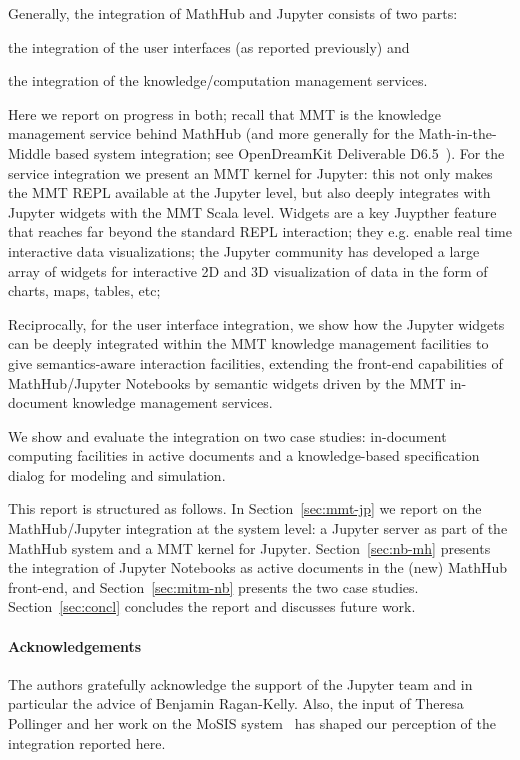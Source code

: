 Generally, the integration of MathHub and Jupyter consists of two parts:
\begin{inparaenum}[\em a\rm )]
\item the integration of the user interfaces (as reported previously) and
\item the integration of the knowledge/computation management services.
\end{inparaenum}
Here we report on progress in both; recall that MMT is the knowledge management service behind MathHub (and more generally for the Math-in-the-Middle based system integration; see OpenDreamKit Deliverable D6.5~\cite{ODK-D6.5}).
%
For the service integration we present an MMT kernel for Jupyter: this not only makes the MMT REPL available at the Jupyter level, but also deeply integrates with Jupyter widgets with the MMT Scala level.  Widgets are a key Juypther feature that reaches far beyond the standard REPL interaction; they e.g.  enable real time interactive data visualizations; the Jupyter community has developed a large array of widgets for interactive 2D and 3D visualization of data in the form of charts, maps, tables, etc;

Reciprocally, for the user interface integration, we show how the Jupyter widgets can be deeply integrated within the MMT knowledge management facilities to give semantics-aware interaction facilities, extending the front-end capabilities of MathHub/Jupyter Notebooks by semantic widgets driven by the MMT in-document knowledge management services.

We show and evaluate the integration on two case studies: in-document computing facilities in active documents and a knowledge-based specification dialog for modeling and simulation. 

This report is structured as follows. In Section~\ref{sec:mmt-jp} we report on the MathHub/Jupyter integration at the system level: a Jupyter server as part of the MathHub system and a MMT kernel for Jupyter. Section~\ref{sec:nb-mh} presents the integration of Jupyter Notebooks as active documents in the (new) MathHub front-end, and Section~\ref{sec:mitm-nb} presents the two case studies. Section~\ref{sec:concl} concludes the report and discusses future work.



\paragraph{Acknowledgements} The authors gratefully acknowledge the support of the Jupyter team and in particular the advice of Benjamin Ragan-Kelly. Also, the input of Theresa Pollinger and her work on the MoSIS system~\cite{PolKohKoe:kacse18} has shaped our perception of the integration reported here. 

